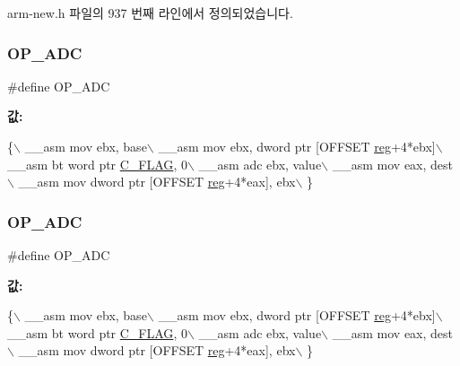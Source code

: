 arm-\/new.\+h 파일의 937 번째 라인에서 정의되었습니다.

\mbox{\label{_g_b_a_8cpp_ac12e4e04c89f3959eaf58c68f88185e0}} 
\subsubsection{\texorpdfstring{O\+P\+\_\+\+A\+DC}{OP\_ADC}\hspace{0.1cm}{\footnotesize\ttfamily [1/2]}}
{\footnotesize\ttfamily \#define O\+P\+\_\+\+A\+DC}

{\bfseries 값\+:}
\begin{DoxyCode}
\{\(\backslash\)
        \_\_asm mov ebx, base\(\backslash\)
        \_\_asm mov ebx, dword ptr [OFFSET \mbox{\hyperlink{_g_b_a_8h_ae29faba89509024ffd1a292badcedf2d}{reg}}+4*ebx]\(\backslash\)
        \_\_asm bt word ptr \mbox{\hyperlink{_g_b_8h_aa29c80f7f7f901ec7a2c57887f56585d}{C\_FLAG}}, 0\(\backslash\)
        \_\_asm adc ebx, value\(\backslash\)
        \_\_asm mov eax, dest\(\backslash\)
        \_\_asm mov dword ptr [OFFSET \mbox{\hyperlink{_g_b_a_8h_ae29faba89509024ffd1a292badcedf2d}{reg}}+4*eax], ebx\(\backslash\)
      \}
\end{DoxyCode}
\mbox{\label{arm-new_8h_ac12e4e04c89f3959eaf58c68f88185e0}} 
\subsubsection{\texorpdfstring{O\+P\+\_\+\+A\+DC}{OP\_ADC}\hspace{0.1cm}{\footnotesize\ttfamily [2/2]}}
{\footnotesize\ttfamily \#define O\+P\+\_\+\+A\+DC}

{\bfseries 값\+:}
\begin{DoxyCode}
\{\(\backslash\)
        \_\_asm mov ebx, base\(\backslash\)
        \_\_asm mov ebx, dword ptr [OFFSET \mbox{\hyperlink{_g_b_a_8h_ae29faba89509024ffd1a292badcedf2d}{reg}}+4*ebx]\(\backslash\)
        \_\_asm bt word ptr \mbox{\hyperlink{_g_b_8h_aa29c80f7f7f901ec7a2c57887f56585d}{C\_FLAG}}, 0\(\backslash\)
        \_\_asm adc ebx, value\(\backslash\)
        \_\_asm mov eax, dest\(\backslash\)
        \_\_asm mov dword ptr [OFFSET \mbox{\hyperlink{_g_b_a_8h_ae29faba89509024ffd1a292badcedf2d}{reg}}+4*eax], ebx\(\backslash\)
      \}
\end{DoxyCode}


